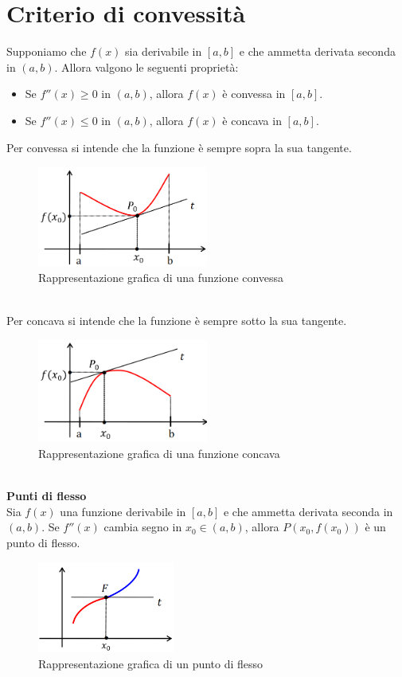 \documentclass{article}
\begin{document}
\section*{Criterio di convessità}
Supponiamo che $f(x)$ sia derivabile in $[a,b]$ e che ammetta derivata seconda in $(a,b)$. Allora valgono le seguenti proprietà:
\begin{itemize}
    \item Se $f''(x)\geq0$ in $(a,b)$, allora $f(x)$ è convessa in $[a,b]$.
    \item Se $f''(x)\leq0$ in $(a,b)$, allora $f(x)$ è concava in $[a,b]$.
\end{itemize}
Per convessa si intende che la funzione è sempre sopra la sua tangente.
\begin{figure}[h]
    \centering
    \includegraphics[width=0.5\textwidth]{convessa.png}
    \caption{Rappresentazione grafica di una funzione convessa}
\end{figure}\\
Per concava si intende che la funzione è sempre sotto la sua tangente.
\begin{figure}[h]
    \centering
    \includegraphics[width=0.5\textwidth]{concava.png}
    \caption{Rappresentazione grafica di una funzione concava}
\end{figure}\\
\newpage
\textbf{Punti di flesso}\\
Sia $f(x)$ una funzione derivabile in $[a,b]$ e che ammetta derivata seconda in $(a,b)$. Se $f''(x)$ cambia segno in $x_0 \in (a,b)$, allora $P(x_0,f(x_0))$ è un punto di flesso.
\begin{figure}[h]
    \centering
    \includegraphics[width=0.4\textwidth]{flesso.png}
    \caption{Rappresentazione grafica di un punto di flesso}
\end{figure}\\
\end{document}
